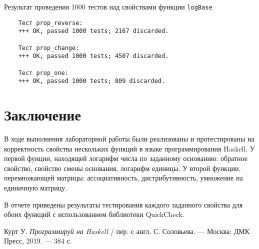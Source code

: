 \documentclass[10pt,a4paper,final]{article} %
\begin{document}
Результат проведения 1000 тестов над свойствами функции \texttt{logBase}
\begin{lstlisting}
	Тест prop_reverse:
	+++ OK, passed 1000 tests; 2167 discarded.
	
	Тест prop_change:
	+++ OK, passed 1000 tests; 4507 discarded.
	
	Тест prop_one:
	+++ OK, passed 1000 tests; 809 discarded.
\end{lstlisting}
\newpage
\section* {Заключение}


В ходе выполнения лабораторной работы были реализованы и протестированы на корректность свойства нескольких функций в языке программирования Haskell. У первой фунции, находящей логарифм числа по заданному основанию: обратное свойство, свойство смены основания,  логарифм единицы. У второй функции, перемножающей матрицы: ассоциативность, дистрибутивность, умножение на единичную матрицу.

В отчете приведены результаты тестирования каждого заданного свойства для обоих функций с использованием библиотеки QuickCheck.




\newpage

\begin{thebibliography}{99}
	
	Курт У. \textit{Программируй на Haskell} / пер. с англ. С. Соловьева. — Москва: ДМК Пресс, 2019. — 384 с.
	

\end{thebibliography}

\end{document}
